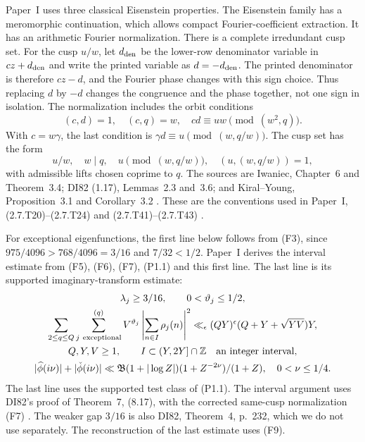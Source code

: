 \begin{fact}\label{fact:eisenstein-inputs}
Paper~I uses three classical Eisenstein properties.
The Eisenstein family has a meromorphic continuation, which allows compact
Fourier-coefficient extraction. It has an arithmetic Fourier normalization.
There is a complete irredundant cusp set.
For the cusp $u/w$, let $d_{\rm den}$ be the lower-row denominator variable
in $cz+d_{\rm den}$ and write the printed variable as $d=-d_{\rm den}$.
The printed denominator is therefore $cz-d$, and the Fourier phase changes
with this sign choice. Thus replacing $d$ by $-d$ changes the congruence and
the phase together, not one sign in isolation.
The normalization includes the orbit conditions
\[
 (c,d)=1,\quad(c,q)=w,\quad cd\equiv uw\pmod{(w^2,q)}.
\]
With $c=w\gamma$, the last condition is
$\gamma d\equiv u\pmod{(w,q/w)}$. The cusp set has the form
\[
 u/w,\quad w\mid q,\quad u\pmod{(w,q/w)},\quad
 (u,(w,q/w))=1,
\]
with admissible lifts chosen coprime to $q$.
The sources are Iwaniec, Chapter~6 and Theorem~3.4;
DI82 (1.17), Lemmas~2.3 and~3.6;
and Kiral--Young, Proposition~3.1 and Corollary~3.2
\cite[Chapter~6; Theorem~3.4]{IwaniecSpectralMethods2002}
\cite[(1.17), p.~227; Lemma~2.3, p.~240; Lemma~3.6, p.~247]{DI82}
\cite[Proposition~3.1, Corollary~3.2]{KiralYoung2017}.
These are the conventions used in Paper~I, (2.7.T20)--(2.7.T24)
and (2.7.T41)--(2.7.T43)
\cite[(2.7.T20)--(2.7.T24), (2.7.T41)--(2.7.T43), pp.~18--19, 22--23]{PaperI}.
\end{fact}

\begin{fact}\label{fact:remaining-spectral-inputs}
For exceptional eigenfunctions, the first line below follows from (F3), since
$975/4096>768/4096=3/16$ and $7/32<1/2$.
Paper~I derives the interval estimate from (F5), (F6), (F7),
(P1.1) and this first line.
The last line is its supported imaginary-transform estimate:
\begin{equation}\label{eq:remaining-spectral-inputs}
 \begin{gathered}
 \lambda_j\ge3/16,\qquad 0<\vartheta_j\le1/2,\\
 \sum_{2\le q\le Q}\sum_{j\ {\rm exceptional}}^{(q)}V^{\vartheta_j}
       \left|\sum_{n\in I}\rho_j(n)\right|^2
 \ll_\epsilon(QY)^\epsilon(Q+Y+\sqrt{YV})Y,\\
 Q,Y,V\ge1,\qquad I\subset(Y,2Y]\cap\mathbb Z\quad\text{an integer interval},\\
 |\widehat\phi(i\nu)|+|\check\phi(i\nu)|
 \ll\mathfrak B(1+|\log Z|)(1+Z^{-2\nu})/(1+Z),
 \quad0<\nu\le1/4.
 \end{gathered}
\end{equation}
The last line uses the supported test class of (P1.1).
The interval argument uses DI82's proof of Theorem~7, (8.17),
with the corrected same-cusp normalization (F7)
\cite[proof of Theorem~7, (8.17)]{DI82}
\cite[(2.9), (2.7.T32), pp.~6, 20]{PaperI}.
The weaker gap $3/16$ is also DI82, Theorem~4, p.~232,
which we do not use separately.
The reconstruction of the last estimate uses (F9).
\end{fact}


